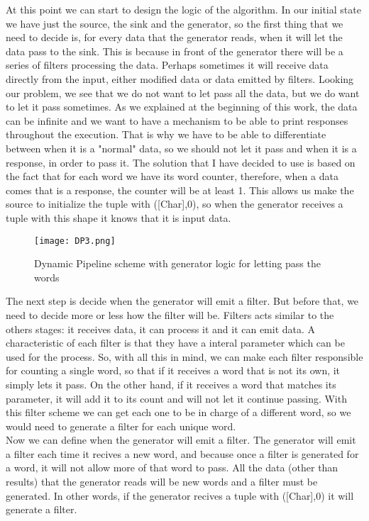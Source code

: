 At this point we can start to design the logic of the algorithm.
In our initial state we have just the source, the sink and the generator, so the first thing that we need to decide is, for every data that the generator reads, when it will let the data pass to the sink.
This is because in front of the generator there will be a series of filters processing the data.
Perhaps sometimes it will receive data directly from the input, either modified data or data emitted by filters.
Looking our problem, we see that we do not want to let pass all the data, but we do want to let it pass sometimes.
As we explained at the beginning of this work, the data can be infinite and we want to have a mechanism to be able to print responses throughout the execution.
That is why we have to be able to differentiate between when it is a "normal" data, so we should not let it pass and when it is a response, in order to pass it.
The solution that I have decided to use is based on the fact that for each word we have its word counter, therefore, when a data comes that is a response, the counter will be at least 1.
This allows us make the source to initialize the tuple with ([Char],0), so when the generator receives a tuple with this shape it knows that it is input data.
\begin{figure}[H]
    \centering
    \texttt{[image: DP3.png]}
    \caption{Dynamic Pipeline scheme with generator logic for letting pass the words}
    \label{fig:DP3}
\end{figure}
The next step is decide when the generator will emit a filter.
But before that, we need to decide more or less how the filter will be.
Filters acts similar to the others stages: it receives data, it can process it and it can emit data.
A characteristic of each filter is that they have a interal parameter which can be used for the process.
So, with all this in mind, we can make each filter responsible for counting a single word, so that if it receives a word that is not its own, it simply lets it pass.
On the other hand, if it receives a word that matches its parameter, it will add it to its count and will not let it continue passing.
With this filter scheme we can get each one to be in charge of a different word, so we would need to generate a filter for each unique word.
\\

Now we can define when the generator will emit a filter.
The generator will emit a filter each time it recives a new word, and because once a filter is generated for a word, it will not allow more of that word to pass.
All the data (other than results) that the generator reads will be new words and a filter must be generated.
In other words, if the generator recives a tuple with ([Char],0) it will generate a filter. 
\\

